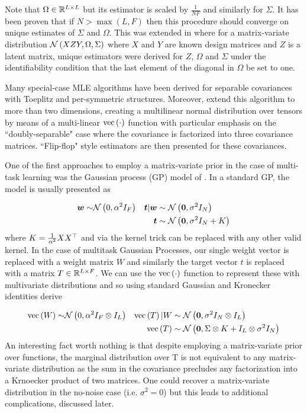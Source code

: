 Note that $\Omega \in { \mathbb{R}^{L \times L} }$ but its estimator is scaled by $\frac{1}{N F}$ and similarly for $\Sigma$. It has been proven that if $N > \max(L, F)$ then this procedure should converge on unique estimates of $\Sigma$ and $\Omega$\cite{Srivastava2009}. This was extended in \cite{Srivastava2009a} where for a matrix-variate distribution $\mathcal{N} \left(XZY, \Omega, \Sigma\right)$ where $X$ and $Y$ are known design matrices and $Z$ is a latent matrix, unique estimators were derived for $Z$, $\Omega$ and $\Sigma$ under the identifiability condition that the last element of the diagonal in $\Omega$ be set to one.

Many special-case MLE algorithms have been derived for separable covariances with Toeplitz\cite{Wirfalt2010} and per-symmetric\cite{Jansson} structures. Moreover, \cite{Ohlson2011}\cite{Ohlson2013} extend this algorithm to more than two dimensions, creating a multilinear normal distribution over tensors by means of a multi-linear $\text{vec}\left(\cdot\right)$ function with particular emphasis on the ``doubly-separable" case where the covariance is factorized into three covariance matrices. ``Flip-flop" style estimators are then presented for these covariances.


One of the first approaches to employ a matrix-variate prior in the case of multi-task learning was the Gaussian process (GP) model of \cite{Bonilla2008}. In a standard GP, the model is usually presented as

\begin{align}
\bm w \sim & \mathcal{N} \left( {0}, {\alpha^2 I_F} \right) & \bm t|\bm w & \sim \mathcal{N} \left( {\bm 0}, {\sigma^2 I_N} \right) \\
& & \bm t & \sim \mathcal{N} \left( {\bm 0}, {\sigma^2I_N + K} \right)
\end{align}
where $K = \frac{1}{\alpha^2} X X^\top$ and via the kernel trick\cite{Jst2004} can be replaced with any other valid kernel. In the case of multitask Gaussian Processes, our single weight vector is replaced with a weight matrix $W$ and similarly the target vector $t$ is replaced with a matrix $T \in { \mathbb{R}^{L \times F} }$. We can use the $\text{vec}\left(\cdot\right)$ function to represent these with multivariate distributions and so using standard Gaussian\cite{Bishop2006} and Kronecker\cite{Minka2000a} identities derive

\begin{align}
\text{vec}\left(W\right) \sim & \mathcal{N} \left( {0}, {\alpha^2 I_F \otimes I_L} \right) & \text{vec}\left(T\right)|W & \sim \mathcal{N} \left( {\bm 0}, {\sigma^2 I_N \otimes I_L} \right) \\
& & \text{vec}\left(T\right) & \sim \mathcal{N} \left( {\bm 0}, {\Sigma \otimes K + I_L \otimes \sigma^2I_N} \right)
\end{align}
An interesting fact worth nothing is that despite employing a matrix-variate prior over functions, the marginal distribution over T is not equivalent to any matrix-variate distribution as the sum in the covariance precludes any factorization into a Krnoecker product of two matrices. One could recover a matrix-variate distribution in the no-noise case (i.e. $\sigma^2 = 0$) but this leads to additional complications, discussed later.

